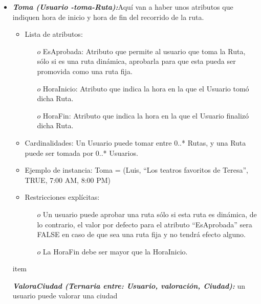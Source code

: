 \documentclass[a4paper]{article}
\begin{document}
\begin{itemize}
{}


\item{

	\textbf{\textit{Toma (Usuario -toma-Ruta):}}Aquí van a haber unos atributos que indiquen hora de inicio y hora de fin del recorrido de la ruta.
  		
        
        
 \begin{itemize}
        
  \item Lista de atributos:
  
  
  \begin{itemize}
\item[$o$]EsAprobada: Atributo que permite al usuario que toma la Ruta, sólo si es una
ruta dinámica, aprobarla para que esta pueda ser promovida como una ruta fija.
\item[$o$]HoraInicio: Atributo que indica la hora en la que el Usuario tomó dicha Ruta.
\item[$o$] HoraFin: Atributo que indica la hora en la que el Usuario finalizó dicha Ruta.

\end{itemize}

\item Cardinalidades: Un Usuario puede tomar entre 0..* Rutas, y una Ruta puede ser tomada por 0..* Usuarios.
\item Ejemplo de instancia: Toma = {(Luis, “Los teatros favoritos de Teresa”, TRUE, 7:00 AM, 8:00
PM)}



\item Restricciones explícitas:
\begin{itemize}
\item[$o$]Un usuario puede aprobar una ruta sólo si esta ruta es dinámica, de lo contrario, el valor por defecto para el atributo “EsAprobada” sera FALSE en caso de que sea una ruta fija y no tendrá efecto alguno.
\item[$o$]La HoraFin debe ser mayor que la HoraInicio.

\end{itemize}
   \end{itemize}
   
}


item{

  
	\textbf{\textit{ValoraCiudad (Ternaria entre: Usuario, valoración, Ciudad):}}
     un usuario puede valorar una ciudad
        
        
 \begin{itemize}
        

\end{itemize}}
\end{itemize}
\end{document}
